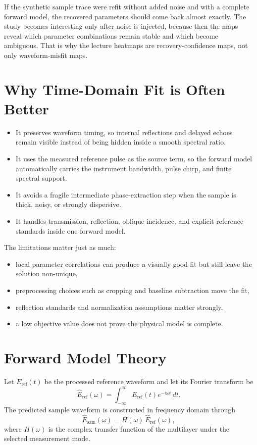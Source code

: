 \documentclass[11pt]{article}
\begin{document}
If the synthetic sample trace were refit without added noise and with a complete forward model, the recovered parameters should come back almost exactly. The study becomes interesting only after noise is injected, because then the maps reveal which parameter combinations remain stable and which become ambiguous. That is why the lecture heatmaps are recovery-confidence maps, not only waveform-misfit maps.

\section{Why Time-Domain Fit is Often Better}
\begin{itemize}[leftmargin=2em]
\item It preserves waveform timing, so internal reflections and delayed echoes remain visible instead of being hidden inside a smooth spectral ratio.
\item It uses the measured reference pulse as the source term, so the forward model automatically carries the instrument bandwidth, pulse chirp, and finite spectral support.
\item It avoids a fragile intermediate phase-extraction step when the sample is thick, noisy, or strongly dispersive.
\item It handles transmission, reflection, oblique incidence, and explicit reference standards inside one forward model.
\end{itemize}

The limitations matter just as much:
\begin{itemize}[leftmargin=2em]
\item local parameter correlations can produce a visually good fit but still leave the solution non-unique,
\item preprocessing choices such as cropping and baseline subtraction move the fit,
\item reflection standards and normalization assumptions matter strongly,
\item a low objective value does not prove the physical model is complete.
\end{itemize}

\section{Forward Model Theory}
Let $E_{\mathrm{ref}}(t)$ be the processed reference waveform and let its Fourier transform be
\[
\hat{E}_{\mathrm{ref}}(\omega)=\int_{-\infty}^{\infty}E_{\mathrm{ref}}(t)e^{-i\omega t}\,dt.
\]
The predicted sample waveform is constructed in frequency domain through
\[
\hat{E}_{\mathrm{sam}}(\omega)=H(\omega)\,\hat{E}_{\mathrm{ref}}(\omega),
\]
where $H(\omega)$ is the complex transfer function of the multilayer under the selected measurement mode.
\end{document}
